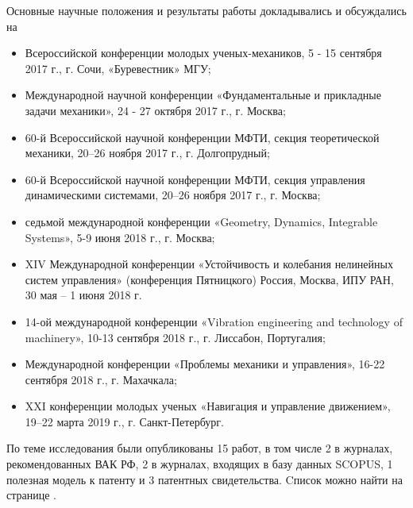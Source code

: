 Основные научные положения и результаты работы докладывались и обсуждались на 
\begin{itemize}
	\item Всероссийской конференции молодых ученых-механиков, 5 - 15 сентября 2017 г., г. Сочи, «Буревестник» МГУ;
	\item Международной научной конференции «Фундаментальные и прикладные задачи механики», 24 - 27 октября 2017 г., г. Москва;
	\item 60-й Всероссийской научной конференции МФТИ, секция теоретической механики, 20–26 ноября 2017 г., г. Долгопрудный;
	\item 60-й Всероссийской научной конференции МФТИ, секция управления динамическими системами, 20–26 ноября 2017 г., г. Москва;
	\item седьмой международной конференции «Geometry, Dynamics, Integrable Systems», 5-9 июня 2018 г., г. Москва;
	\item XIV Международной конференции «Устойчивость и колебания нелинейных систем управления» (конференция Пятницкого) Россия, Москва, ИПУ РАН, 30 мая -- 1 июня 2018 г.
	\item 14-ой международной конференции «Vibration engineering and technology of machinery», 10-13 сентября 2018 г., г. Лиссабон, Португалия;
	\item Международной конференции «Проблемы механики и управления», 16-22 сентября 2018 г., г. Махачкала;
	\item XXI конференции молодых ученых «Навигация и управление движением», 19–22 марта 2019 г., г. Санкт-Петербург.
\end{itemize}
По теме исследования были опубликованы 15 работ, в том числе 2 в журналах, рекомендованных ВАК РФ, 2 в журналах, входящих в базу данных SCOPUS, 1 полезная модель к патенту и 3 патентных свидетельства. Cписок можно найти на странице \pageref{list_chapter}.

